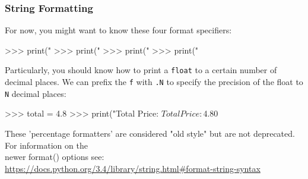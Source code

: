 \documentclass{beamer}
\begin{document}
\begin{frame}[fragile]
\frametitle{String Formatting}
For now, you might want to know these four format specifiers:
\begin{code}
>>> print("%
>>> print("%
>>> print("%
>>> print("%
\end{code}

\vskip 0.3cm
Particularly, you should know how to print a \texttt{float} to a certain
    number of decimal places. We can prefix the \texttt{f} with \texttt{.N}
    to specify the precision of the float to \texttt{N} decimal places:
\begin{code}
>>> total = 4.8
>>> print("Total Price: $%
Total Price: $4.80
\end{code}

{\tiny{These 'percentage formatters' are considered "old style" but are not deprecated. For information on the\\\vskip -0.15cm newer format() options see: \url{https://docs.python.org/3.4/library/string.html#format-string-syntax}}}
\end{frame}












\end{document}
